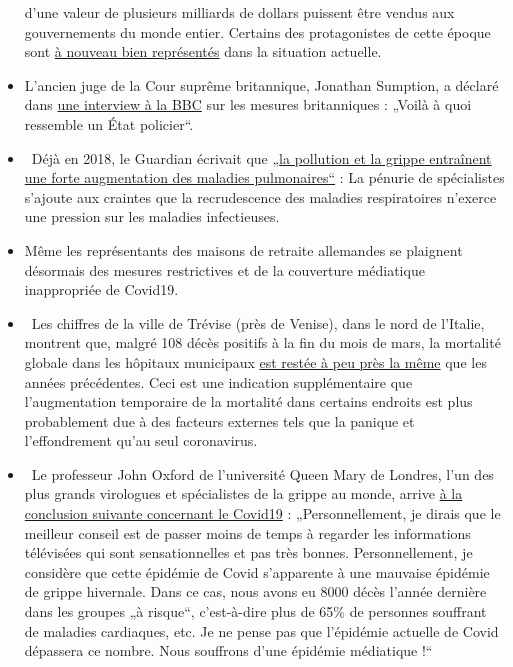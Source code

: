 \begin{itemize}
  d'une valeur de plusieurs milliards de dollars puissent être vendus
  aux gouvernements du monde entier. Certains des protagonistes de cette
  époque sont \href{https://www.nature.com/articles/news.2009.424}{à
  nouveau bien représentés} dans la situation actuelle.
\item
  L'ancien juge de la Cour suprême britannique, Jonathan Sumption, a
  déclaré dans
  \href{https://www.spectator.co.uk/article/former-supreme-court-justice-this-is-what-a-police-state-is-like-}{une
  interview à la BBC} sur les mesures britanniques : „Voilà à quoi
  ressemble un État policier``.
\item
  ~Déjà en 2018, le Guardian écrivait que
  „\href{https://www.theguardian.com/society/2018/dec/09/steep-rise-lung-related-illness-hospitals-nhs}{la
  pollution et la grippe entraînent une forte augmentation des maladies
  pulmonaires``} : La pénurie de spécialistes s'ajoute aux craintes que
  la recrudescence des maladies respiratoires n'exerce une pression sur
  les maladies infectieuses.
\item
  Même les représentants des maisons de retraite allemandes se plaignent
  désormais des mesures restrictives et de la couverture médiatique
  inappropriée de Covid19.
\item
  ~Les chiffres de la ville de Trévise (près de Venise), dans le nord de
  l'Italie, montrent que, malgré 108 décès positifs à la fin du mois de
  mars, la mortalité globale dans les hôpitaux municipaux
  \href{https://swprs.files.wordpress.com/2020/04/reppublica-treviso.jpg}{est
  restée à peu près la même} que les années précédentes. Ceci est une
  indication supplémentaire que l'augmentation temporaire de la
  mortalité dans certains endroits est plus probablement due à des
  facteurs externes tels que la panique et l'effondrement qu'au seul
  coronavirus.
\item
  ~Le professeur John Oxford de l'université Queen Mary de Londres, l'un
  des plus grands virologues et spécialistes de la grippe au monde,
  arrive
  \href{https://novuscomms.com/2020/03/31/a-view-from-the-hvivo-open-orphan-orph-laboratory-professor-john-oxford/}{à
  la conclusion suivante concernant le Covid19} : „Personnellement, je
  dirais que le meilleur conseil est de passer moins de temps à regarder
  les informations télévisées qui sont sensationnelles et pas très
  bonnes. Personnellement, je considère que cette épidémie de Covid
  s'apparente à une mauvaise épidémie de grippe hivernale. Dans ce cas,
  nous avons eu 8000 décès l'année dernière dans les groupes „à
  risque``, c'est-à-dire plus de 65\% de personnes souffrant de maladies
  cardiaques, etc. Je ne pense pas que l'épidémie actuelle de Covid
  dépassera ce nombre. Nous souffrons d'une épidémie médiatique !``
\end{itemize}

